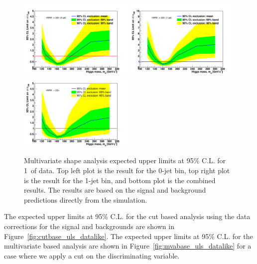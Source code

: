 \begin{figure}[!htbp]
\begin{center}
   \includegraphics[width=0.49\textwidth]{figures/limits_mva_shape_1ifb_0jet.pdf}
   \includegraphics[width=0.49\textwidth]{figures/limits_mva_shape_1ifb_1jet.pdf}
   \includegraphics[width=0.49\textwidth]{figures/limits_mva_shape_1ifb_combined.pdf}
   \caption{Multivariate shape analysis expected upper limits at 95\% C.L. for 1\ifb\ of data. Top left plot 
   is the result for the 0-jet bin, top right plot is the result for the 1-jet bin, and 
   bottom plot is the combined results. The results 
   are based on the signal and background predictions directly from the simulation.}
   \label{fig:mvashape_uls}
\end{center}
\end{figure}

The expected upper limits at 95\% C.L. for the cut based analysis using the data corrections 
for the signal and backgrounds are shown in Figure~\ref{fig:cutbase_uls_datalike}. The expected upper limits at
95\% C.L. for the multivariate based analysis are shown in
Figure~\ref{fig:mvabase_uls_datalike} for a case where we apply a cut on the
discriminating variable.

